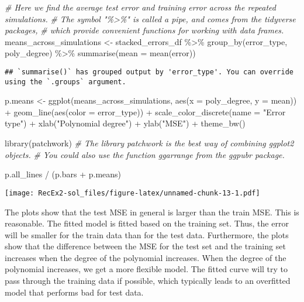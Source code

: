 \documentclass[
]{article}
\newenvironment{Shaded}{\begin{snugshade}}{\end{snugshade}}
\newcommand{\AttributeTok}[1]{\textcolor[rgb]{0.77,0.63,0.00}{#1}}
\newcommand{\CommentTok}[1]{\textcolor[rgb]{0.56,0.35,0.01}{\textit{#1}}}
\newcommand{\FunctionTok}[1]{\textcolor[rgb]{0.00,0.00,0.00}{#1}}
\newcommand{\NormalTok}[1]{#1}
\newcommand{\OtherTok}[1]{\textcolor[rgb]{0.56,0.35,0.01}{#1}}
\newcommand{\SpecialCharTok}[1]{\textcolor[rgb]{0.00,0.00,0.00}{#1}}
\newcommand{\StringTok}[1]{\textcolor[rgb]{0.31,0.60,0.02}{#1}}
\begin{document}
\begin{Shaded}
\begin{Highlighting}[]
\CommentTok{\# Here we find the average test error and training error across the repeated simulations. }
\CommentTok{\# The symbol "\%\textgreater{}\%" is called a pipe, and comes from the tidyverse packages, }
\CommentTok{\# which provide convenient functions for working with data frames.}
\NormalTok{means\_across\_simulations }\OtherTok{\textless{}{-}}\NormalTok{ stacked\_errors\_df }\SpecialCharTok{\%\textgreater{}\%} 
  \FunctionTok{group\_by}\NormalTok{(error\_type, poly\_degree) }\SpecialCharTok{\%\textgreater{}\%} 
  \FunctionTok{summarise}\NormalTok{(}\AttributeTok{mean =} \FunctionTok{mean}\NormalTok{(error))}
\end{Highlighting}
\end{Shaded}

\begin{verbatim}
## `summarise()` has grouped output by 'error_type'. You can override using the `.groups` argument.
\end{verbatim}

\begin{Shaded}
\begin{Highlighting}[]
\NormalTok{p.means }\OtherTok{\textless{}{-}} \FunctionTok{ggplot}\NormalTok{(means\_across\_simulations, }\FunctionTok{aes}\NormalTok{(}\AttributeTok{x =}\NormalTok{ poly\_degree, }\AttributeTok{y =}\NormalTok{ mean)) }\SpecialCharTok{+}
  \FunctionTok{geom\_line}\NormalTok{(}\FunctionTok{aes}\NormalTok{(}\AttributeTok{color =}\NormalTok{ error\_type)) }\SpecialCharTok{+}
  \FunctionTok{scale\_color\_discrete}\NormalTok{(}\AttributeTok{name =} \StringTok{"Error type"}\NormalTok{) }\SpecialCharTok{+}
  \FunctionTok{xlab}\NormalTok{(}\StringTok{"Polynomial degree"}\NormalTok{) }\SpecialCharTok{+}
  \FunctionTok{ylab}\NormalTok{(}\StringTok{"MSE"}\NormalTok{) }\SpecialCharTok{+}
  \FunctionTok{theme\_bw}\NormalTok{()}

\FunctionTok{library}\NormalTok{(patchwork) }\CommentTok{\# The library patchwork is the best way of combining ggplot2 objects. }
\CommentTok{\# You could also use the function ggarrange from the ggpubr package.}

\NormalTok{p.all\_lines }\SpecialCharTok{/}\NormalTok{ (p.bars }\SpecialCharTok{+}\NormalTok{ p.means)}
\end{Highlighting}
\end{Shaded}

\texttt{[image: RecEx2-sol\_files/figure-latex/unnamed-chunk-13-1.pdf]}

The plots show that the test MSE in general is larger than the train
MSE. This is reasonable. The fitted model is fitted based on the
training set. Thus, the error will be smaller for the train data than
for the test data. Furthermore, the plots show that the difference
between the MSE for the test set and the training set increases when the
degree of the polynomial increases. When the degree of the polynomial
increases, we get a more flexible model. The fitted curve will try to
pass through the training data if possible, which typically leads to an
overfitted model that performs bad for test data.
\end{document}
